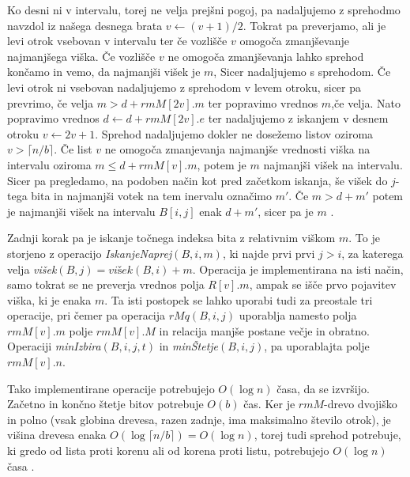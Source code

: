 Ko desni ni v intervalu, torej ne velja prejšni pogoj, pa nadaljujemo z sprehodmo navzdol iz našega desnega brata $v\leftarrow (v+1)/2$. Tokrat pa preverjamo, ali je levi otrok vsebovan v intervalu ter če vozlišče $v$ omogoča zmanjševanje najmanjšega viška. Če vozlišče $v$ ne omogoča zmanjševanja lahko sprehod končamo in vemo, da najmanjši višek je $m$, Sicer nadaljujemo s sprehodom. Če levi otrok ni vsebovan nadaljujemo z sprehodom v levem otroku, sicer pa prevrimo, če velja $m>d+rmM[2v].m$ ter popravimo vrednos $m$,če velja. Nato popravimo vrednos $d\leftarrow d+rmM[2v].e$ ter nadaljujemo z iskanjem v desnem otroku $v\leftarrow 2v+1$. Sprehod nadaljujemo dokler ne dosežemo listov oziroma $v>\lceil n/b\rceil$. Če list $v$ ne omogoča zmanjevanja najmanjše vrednosti viška na intervalu oziroma $m\le d+rmM[v].m$, potem je $m$ najmanjši višek na intervalu. Sicer pa pregledamo, na podoben način kot pred začetkom iskanja, še višek do $j$-tega bita in najmanjši votek na tem inervalu označimo $m'$. Če $m>d+m'$ potem je najmanjši višek na intervalu $B[i,j]$ enak $d+m'$, sicer pa je $m$ \cite{Navarro2016}. 

Zadnji korak pa je iskanje točnega indeksa bita z relativnim viškom $m$. To je storjeno z operacijo \textit{IskanjeNaprej}$(B,i,m)$, ki najde prvi prvi $j> i$, za katerega velja \textit{višek}$(B,j)=\textit{višek}(B,i)+m$. Operacija je implementirana na isti način, samo tokrat se ne preverja vrednos polja $R[v].m$, ampak se išče prvo pojavitev viška, ki je enaka $m$. Ta isti  postopek se lahko uporabi tudi za preostale tri operacije, pri čemer pa operacija $rMq(B,i,j)$ uporablja namesto polja $rmM[v].m$ polje $rmM[v].M$ in relacija manjše postane večje in obratno. Operaciji \textit{minIzbira}$(B,i,j,t)$ in \textit{minŠtetje}$(B,i,j)$, pa uporablajta polje $rmM[v].n$\cite{Navarro2016}.

Tako implementirane operacije potrebujejo $O(\log{n})$ časa, da se izvršijo. Začetno in končno štetje bitov potrebuje $O(b)$ čas. Ker je $rmM$-drevo dvojiško in polno (vsak globina drevesa, razen zadnje, ima maksimalno število otrok),  je višina drevesa enaka $O(\log{\lceil n/b\rceil})=O(\log{n})$, torej tudi sprehod potrebuje, ki gredo od lista proti korenu ali od korena proti listu, potrebujejo $O(\log{n})$ časa \cite{Navarro2016}.